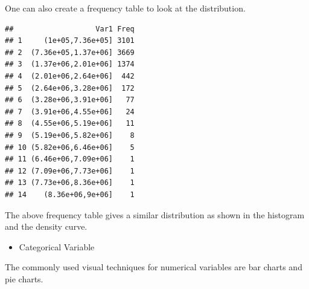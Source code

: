 \documentclass[
]{book}
\newenvironment{Shaded}{\begin{snugshade}}{\end{snugshade}}
\newcommand{\AttributeTok}[1]{\textcolor[rgb]{0.13,0.29,0.53}{#1}}
\newcommand{\DecValTok}[1]{\textcolor[rgb]{0.00,0.00,0.81}{#1}}
\newcommand{\FunctionTok}[1]{\textcolor[rgb]{0.13,0.29,0.53}{\textbf{#1}}}
\newcommand{\NormalTok}[1]{#1}
\newcommand{\OtherTok}[1]{\textcolor[rgb]{0.56,0.35,0.01}{#1}}
\newcommand{\SpecialCharTok}[1]{\textcolor[rgb]{0.81,0.36,0.00}{\textbf{#1}}}
\newcommand{\StringTok}[1]{\textcolor[rgb]{0.31,0.60,0.02}{#1}}
\providecommand{\tightlist}{%
  \setlength{\itemsep}{0pt}\setlength{\parskip}{0pt}}
\begin{document}
One can also create a frequency table to look at the distribution.

\begin{Shaded}
\end{Shaded}

\begin{verbatim}
##                   Var1 Freq
## 1     (1e+05,7.36e+05] 3101
## 2  (7.36e+05,1.37e+06] 3669
## 3  (1.37e+06,2.01e+06] 1374
## 4  (2.01e+06,2.64e+06]  442
## 5  (2.64e+06,3.28e+06]  172
## 6  (3.28e+06,3.91e+06]   77
## 7  (3.91e+06,4.55e+06]   24
## 8  (4.55e+06,5.19e+06]   11
## 9  (5.19e+06,5.82e+06]    8
## 10 (5.82e+06,6.46e+06]    5
## 11 (6.46e+06,7.09e+06]    1
## 12 (7.09e+06,7.73e+06]    1
## 13 (7.73e+06,8.36e+06]    1
## 14    (8.36e+06,9e+06]    1
\end{verbatim}

The above frequency table gives a similar distribution as shown in the histogram and the density curve.

\begin{itemize}
\tightlist
\item
  Categorical Variable
\end{itemize}

The commonly used visual techniques for numerical variables are bar charts and pie charts.

\begin{Shaded}
\end{Shaded}
\end{document}
